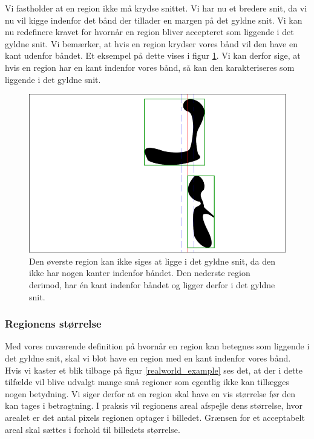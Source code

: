 {Vi fastholder at en region ikke må krydse snittet. Vi har nu et bredere
snit, da vi nu vil kigge indenfor det bånd der tillader en margen på det
gyldne snit. Vi kan nu redefinere kravet for hvornår en region bliver
accepteret som liggende i det gyldne snit. Vi bemærker, at hvis en
region krydser vores bånd vil den have en kant udenfor båndet. Et
eksempel på dette vises i figur \ref{bbox_section}. Vi kan derfor sige,
at hvis en region har en kant indenfor vores bånd, så kan den
karakteriseres som liggende i det gyldne snit.
\begin{figure}[h]
	\begin{center}
		\includegraphics[scale=\imgscale,angle=0]{afsnit/vores_implementation/billeder/naiv_algoritme/bbox_section}
	\end{center}
	\caption[Afgrænsende rektangler]{Den øverste region kan ikke
	siges at ligge i det gyldne snit, da den ikke har nogen kanter
	indenfor båndet. Den nederste region derimod, har én kant
	indenfor båndet og ligger derfor i det gyldne snit.}
	\label{bbox_section}
\end{figure}

\subsubsection{Regionens størrelse}
Med vores nuværende definition på hvornår en region kan betegnes som
liggende i det gyldne snit, skal vi blot have en region med en kant
indenfor vores bånd. Hvis vi kaster et blik tilbage på figur
\ref{realworld_example} ses det, at der i dette tilfælde vil blive
udvalgt mange små regioner som egentlig ikke kan tillægges nogen
betydning. Vi siger derfor at en region skal have en vis
størrelse før den kan tages i betragtning. I praksis vil regionens areal
afspejle dens størrelse, hvor arealet er det antal pixels regionen
optager i billedet. Grænsen for et acceptabelt areal skal sættes i
forhold til billedets størrelse.

}

